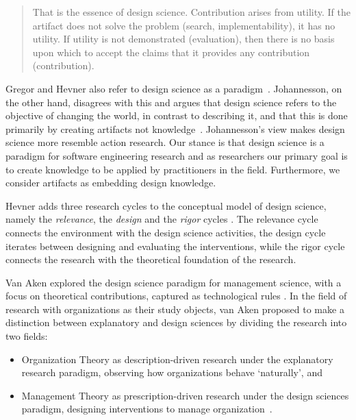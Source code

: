 \documentclass[graybox]{svmult}
\newcommand{\emelie}[1]{\textcolor{red}{{\it [Emelie says: #1]}}}
\newcommand{\emelie}[1]{}
\begin{document}
\begin{quote}
	That is the essence of design science. Contribution arises from utility. If the artifact does not solve the problem (search, implementability), it has no utility. If utility is not demonstrated (evaluation), then there is no basis upon which to accept the claims that it provides any contribution (contribution).~\cite[p. 91]{hevner_design_2004}
\end{quote}


Gregor and Hevner also refer to design science as a paradigm~\cite{gregor_positioning_2013}. Johannesson, on the other hand, disagrees with this and argues that design science refers to the objective of changing the world, in contrast to describing it, and that this is done primarily by creating artifacts not knowledge~\cite{johannesson_introduction_2014}. Johannesson's view makes design science more resemble action research. Our stance is that design science is a paradigm for software engineering research and as researchers our primary goal is to create knowledge to be applied by practitioners in the field. Furthermore, we consider artifacts as embedding design knowledge. 

Hevner adds three research cycles to the conceptual model of design science, namely the \emph{relevance}, the \emph{design} and the \emph{rigor} cycles \cite{Hevner2007}. The relevance cycle connects the environment with the design science activities, the design  cycle iterates between designing and evaluating the interventions, while the rigor cycle connects the research with the theoretical foundation of the research.



Van Aken explored the design science paradigm for management science, with a focus on theoretical contributions, captured as technological rules \cite{van_aken_management_2004,van_aken_management_2005}. 
In the field of research with organizations as their study objects, van Aken proposed to make a distinction between explanatory and design sciences by dividing the research into two fields: 
\begin{itemize}
\item Organization Theory as description-driven research under the explanatory research paradigm, observing how organizations behave `naturally', and 
\item Management Theory as prescription-driven research under the design sciences paradigm, designing interventions to manage organization~\cite{van_aken_management_2004}.  
\end{itemize}
\end{document}
